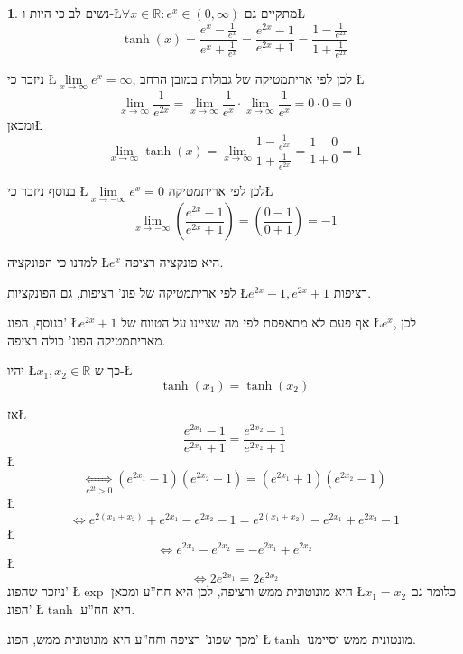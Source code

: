 \documentclass[english,hebrew]{article}
\theoremstyle{plain}
\theoremstyle{definition}
\theoremstyle{definition}
\newtheorem*{sol*}{\protect\solutionname}
\providecommand{\solutionname}{פתרון}
\begin{document}
\begin{sol*}
נשים לב כי היות ו-\L{$\forall x\in\mathbb{R}:e^{x}\in\left(0,\infty\right)$}
מתקיים גם\L{%
\[
\tanh(x)=\frac{e^{x}-\frac{1}{e^{x}}}{e^{x}+\frac{1}{e^{x}}}=\frac{e^{2x}-1}{e^{2x}+1}=\frac{1-\frac{1}{e^{2x}}}{1+\frac{1}{e^{2x}}}
\]
}%

ניזכר כי \L{$\underset{x\rightarrow\infty}{\lim}e^{x}=\infty$}, לכן
לפי אריתמטיקה של גבולות במובן הרחב \L{%
\[
\underset{x\rightarrow\infty}{\lim}\frac{1}{e^{2x}}=\underset{x\rightarrow\infty}{\lim}\frac{1}{e^{x}}\cdot\underset{x\rightarrow\infty}{\lim}\frac{1}{e^{x}}=0\cdot0=0
\]
}%
 ומכאן\L{%
\[
\underset{x\rightarrow\infty}{\lim}\tanh(x)=\underset{x\rightarrow\infty}{\lim}\frac{1-\frac{1}{e^{2x}}}{1+\frac{1}{e^{2x}}}=\frac{1-0}{1+0}=1
\]
}%

בנוסף ניזכר כי \L{$\underset{x\rightarrow-\infty}{\lim}e^{x}=0$}
לכן לפי אריתמטיקה\L{%
\[
\underset{x\rightarrow-\infty}{\lim}\left(\frac{e^{2x}-1}{e^{2x}+1}\right)=\left(\frac{0-1}{0+1}\right)=-1
\]
}%

למדנו כי הפונקציה \L{$e^{x}$} היא פונקציה רציפה.

לפי אריתמטיקה של פונ' רציפות, גם הפונקציות \L{$e^{2x}-1,e^{2x}+1$}
רציפות.

בנוסף, הפונ' \L{$e^{2x}+1$} אף פעם לא מתאפסת לפי מה שציינו על הטווח
של \L{$e^{x}$}, לכן מאריתמטיקה הפונ' כולה רציפה.

יהיו \L{$x_{1},x_{2}\in\mathbb{R}$} כך ש-\L{%
\[
\tanh(x_{1})=\tanh(x_{2})
\]
}%

אז\L{%
\[
\frac{e^{2x_{1}}-1}{e^{2x_{1}}+1}=\frac{e^{2x_{2}}-1}{e^{2x_{2}}+1}
\]
}%
\L{%
\[
\underset{e^{2t}>0}{\iff}\left(e^{2x_{1}}-1\right)\left(e^{2x_{2}}+1\right)=\left(e^{2x_{1}}+1\right)\left(e^{2x_{2}}-1\right)
\]
}%
\L{%
\[
\iff e^{2(x_{1}+x_{2})}+e^{2x_{1}}-e^{2x_{2}}-1=e^{2(x_{1}+x_{2})}-e^{2x_{1}}+e^{2x_{2}}-1
\]
}%
\L{%
\[
\iff e^{2x_{1}}-e^{2x_{2}}=-e^{2x_{1}}+e^{2x_{2}}
\]
}%
\L{%
\[
\iff2e^{2x_{1}}=2e^{2x_{2}}
\]
}%
ניזכר שהפונ' \L{$\exp$} היא מונוטונית ממש ורציפה, לכן היא חח\textquotedblright ע
ומכאן \L{$x_{1}=x_{2}$} כלומר גם הפונ' \L{$\tanh$} היא חח\textquotedblright ע.

מכך שפונ' רציפה וחח\textquotedblright ע היא מונוטונית ממש, הפונ' \L{$\tanh$}
מונטונית ממש וסיימנו.
\end{sol*}
\end{document}

